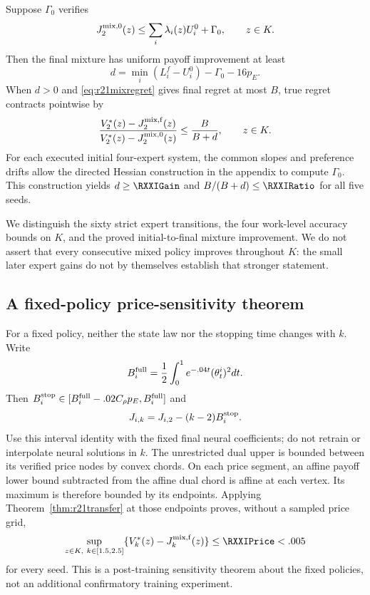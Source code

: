 \begin{theorem}\label{thm:r21gain}
Suppose $\Gamma_0$ verifies
\[
 J^{\rm mix,0}_2(z)\leq\sum_i\lambda_i(z)U_i^0+\Gamma_0,
 \qquad z\in K.
\]
Then the final mixture has uniform payoff improvement at least
\begin{equation}
 d=\min_i(L_i^f-U_i^0)-\Gamma_0-16p_E.\label{eq:r21gain}
\end{equation}
When $d>0$ and \eqref{eq:r21mixregret} gives final regret at most $B$, true regret contracts pointwise by
\begin{equation}
 \frac{V_2^*(z)-J^{\rm mix,f}_2(z)}{V_2^*(z)-J^{\rm mix,0}_2(z)}
 \leq\frac{B}{B+d},\qquad z\in K.\label{eq:r21ratio}
\end{equation}
For each executed initial four-expert system, the common slopes and preference drifts allow the directed Hessian construction in the appendix to compute $\Gamma_0$. This construction yields $d\geq\RXXIGain$ and $B/(B+d)\leq\RXXIRatio$ for all five seeds.
\end{theorem}
We distinguish the sixty strict expert transitions, the four work-level accuracy bounds on $K$, and the proved initial-to-final mixture improvement. We do not assert that every consecutive mixed policy improves throughout $K$: the small later expert gains do not by themselves establish that stronger statement.

\subsection{A fixed-policy price-sensitivity theorem}
For a fixed policy, neither the state law nor the stopping time changes with $k$. Write
\[
 B_i^{\rm full}=\frac12\int_0^1e^{-.04t}(\theta^i_t)^2dt.
\]
Then $B_i^{\rm stop}\in[B_i^{\rm full}-.02C_\rho p_E,B_i^{\rm full}]$ and
\begin{equation}
 J_{i,k}=J_{i,2}-(k-2)B_i^{\rm stop}.\label{eq:r21priceaffine}
\end{equation}
Use this interval identity with the fixed final neural coefficients; do not retrain or interpolate neural solutions in $k$. The unrestricted dual upper is bounded between its verified price nodes by convex chords. On each price segment, an affine payoff lower bound subtracted from the affine dual chord is affine at each vertex. Its maximum is therefore bounded by its endpoints. Applying Theorem~\ref{thm:r21transfer} at those endpoints proves, without a sampled price grid,
\begin{equation}
 \sup_{z\in K,\ k\in[1.5,2.5]}\{V_k^*(z)-J_k^{\rm mix,f}(z)\}
 \leq\RXXIPrice<.005
 \label{eq:r21pricesuccess}
\end{equation}
for every seed. This is a post-training sensitivity theorem about the fixed policies, not an additional confirmatory training experiment.
